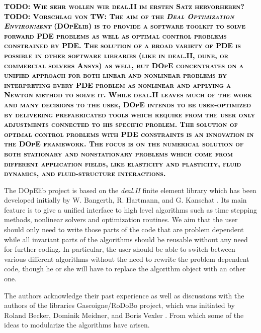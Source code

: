\documentclass[prodmode,acmtoms]{acmsmall}
\numberwithin{equation}{section}
\newcommand{\todo}[1]{\textbf{\textsc{\textcolor{black}{TODO: #1}}}}
\begin{document}
\todo{Wie sehr wollen wir deal.II im ersten Satz hervorheben?}
\todo{Vorschlag von TW: 
The aim of the \textit{Deal Optimization Environment} (DOpElib) 
is to provide a software toolkit to solve forward PDE
problems as well as optimal control problems constrained by PDE. The
solution of a broad variety of PDE is possible in other software
libraries (like in deal.II, dune, or commercial solvers Ansys) 
as well, but
DOpE concentrates on a unified approach for both linear and nonlinear
problems by interpreting every PDE problem as nonlinear and applying a
Newton method to solve it. While deal.II leaves much of the work and many
decisions to the user, DOpE intends to be user-optimized by delivering
prefabricated tools which require from the user only adjustments connected
to his specific problem. The solution of optimal control problems with PDE
constraints is an innovation in the DOpE framework.
The focus is on the numerical solution of both stationary and nonstationary
problems which come from different application fields, like elasticity and
plasticity, fluid dynamics, and fluid-structure interactions.
}

The DOpElib project is 
based on the \textit{deal.II} \cite{deal} finite element library which has been developed
 initially by W. Bangerth, R. Hartmann, and G. Kanschat \cite{deal}.
Its main feature is to give a unified interface to high level algorithms such as 
time stepping methods, nonlinear solvers and optimization routines. 
We aim that the user should only need to write those parts
of the code that are problem dependent while all invariant parts of the algorithms
should be reusable without any need for further coding.
In particular, the user should be able to switch between various different 
algorithms without the need to rewrite the problem dependent code, though he or she will
have to replace the algorithm object with an other one. 

The authors acknowledge their past experience as well as discussions with 
the authors of the libraries 
Gascoigne/RoDoBo project, which was initiated by 
Roland Becker, Dominik Meidner,  and Boris Vexler \cite{rodobo}. 
From which some of the ideas to modularize the algorithms have arisen.

%
\end{document}
